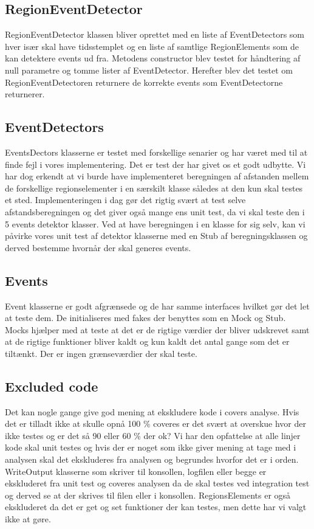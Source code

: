 \subsection{RegionEventDetector}
RegionEventDetector klassen bliver oprettet med en liste af EventDetectors som hver især skal have tidsstemplet og en liste af samtlige RegionElements som de kan detektere events ud fra. Metodens constructor blev testet for håndtering af null parametre og tomme lister af EventDetector. Herefter blev det testet om RegionEventDetectoren returnere de korrekte events som EventDetectorne returnerer.  

\subsection{EventDetectors}
EventsDectors klasserne er testet med forskellige senarier og har været med til at finde fejl i vores implementering. Det er test der har givet os et godt udbytte. Vi har dog erkendt at vi burde have implementeret beregningen af afstanden mellem de forskellige regionselementer i en særskilt klasse således at den kun skal testes et sted. Implementeringen i dag gør det rigtig svært at test selve afstandsberegningen og det giver også mange ens unit test, da vi skal teste den i 5 events detektor klasser. Ved at have beregningen i en klasse for sig selv, kan vi påvirke vores unit test af detektor klasserne med en Stub af beregningsklassen og derved bestemme hvornår der skal generes events.

\subsection{Events}
Event klasserne er godt afgrænsede og de har samme interfaces hvilket gør det let at teste dem. De initialiseres med fakes der benyttes som en Mock og Stub. Mocks hjælper med at teste at det er de rigtige værdier der bliver udskrevet samt at de rigtige funktioner bliver kaldt og kun kaldt det antal gange som det er tiltænkt. Der er ingen grænseværdier der skal teste.

\subsection{Excluded code}
Det kan nogle gange give god mening at ekskludere kode i covers analyse. Hvis det er tilladt ikke at skulle opnå 100 \% coveres er det svært at overskue hvor der ikke testes og er det så 90 eller 60 \% der ok? Vi har den opfattelse at alle linjer kode skal unit testes og hvis der er noget som ikke giver mening at tage med i analysen skal det ekskluderes fra analysen og begrundes hvorfor det er i orden.
WriteOutput klasserne som skriver til konsollen, logfilen eller begge er ekskluderet fra unit test og coveres analysen da de skal testes ved integration test og derved se at der skrives til filen eller i konsollen. 
RegionsElements er også ekskluderet da det er get og set funktioner der kan testes, men dette har vi valgt ikke at gøre.

